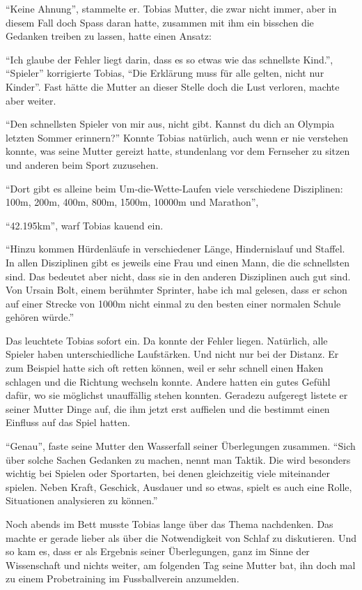 \enquote{Keine Ahnung}, stammelte er. Tobias Mutter, die zwar nicht immer, aber in diesem Fall doch Spass daran hatte, zusammen mit ihm ein bisschen die Gedanken treiben zu lassen, hatte einen Ansatz:

\enquote{Ich glaube der Fehler liegt darin, dass es so etwas wie das schnellste Kind.}, \enquote{Spieler} korrigierte Tobias, \enquote{Die Erklärung muss für alle gelten, nicht nur Kinder}. Fast hätte die Mutter an dieser Stelle doch die Lust verloren, machte aber weiter.

\enquote{Den schnellsten Spieler von mir aus, nicht gibt. Kannst du dich an Olympia letzten Sommer erinnern?} Konnte Tobias natürlich, auch wenn er nie verstehen konnte, was seine Mutter gereizt hatte, stundenlang vor dem Fernseher zu sitzen und anderen beim Sport zuzusehen.


\enquote{Dort gibt es alleine beim Um-die-Wette-Laufen viele verschiedene Disziplinen: 100m, 200m, 400m, 800m, 1500m, 10000m und Marathon},

\enquote{42.195km}, warf Tobias kauend ein. 

\enquote{Hinzu kommen Hürdenläufe in verschiedener Länge, Hindernislauf und Staffel. In allen Disziplinen gibt es jeweils eine Frau und einen Mann, die die schnellsten sind. Das bedeutet aber nicht, dass sie in den anderen Disziplinen auch gut sind. Von Ursain Bolt, einem berühmter Sprinter, habe ich mal gelesen, dass er schon auf einer Strecke von 1000m nicht einmal zu den besten einer normalen Schule gehören würde.}

Das leuchtete Tobias sofort ein. Da konnte der Fehler liegen. Natürlich, alle Spieler haben unterschiedliche Laufstärken. Und nicht nur bei der Distanz. Er zum Beispiel hatte sich oft retten können, weil er sehr schnell einen Haken schlagen und die Richtung wechseln konnte. Andere hatten ein gutes Gefühl dafür, wo sie möglichst unauffällig stehen konnten. Geradezu aufgeregt listete er seiner Mutter Dinge auf, die ihm jetzt erst auffielen und die bestimmt einen Einfluss auf das Spiel hatten.

\enquote{Genau}, faste seine Mutter den Wasserfall seiner Überlegungen zusammen. \enquote{Sich über solche Sachen Gedanken zu machen, nennt man Taktik. Die wird besonders wichtig bei Spielen oder Sportarten, bei denen gleichzeitig viele miteinander spielen. Neben Kraft, Geschick, Ausdauer und so etwas, spielt es auch eine Rolle, Situationen analysieren zu können.}

Noch abends im Bett musste Tobias lange über das Thema nachdenken. Das machte er gerade lieber als über die Notwendigkeit von Schlaf zu diskutieren. Und so kam es, dass er als Ergebnis seiner Überlegungen, ganz im Sinne der Wissenschaft und nichts weiter, am folgenden Tag seine Mutter bat, ihn doch mal zu einem Probetraining im Fussballverein anzumelden.\hfill {}
\newpage
 

 
